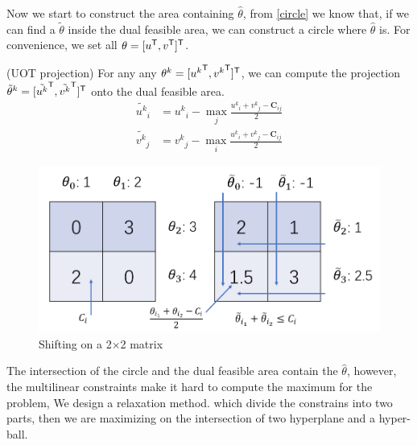 Now we start to construct the area containing $\hat{\theta}$, from \ref{circle} we know that, if we can find a $\tilde{\theta}$ inside the dual feasible area, we can construct a circle where $\hat{\theta}$ is.  For convenience, we set all $\theta = [u^{\mathsf T},v^{\mathsf T}]^{\mathsf T}$.
\begin{thm}
(UOT projection) For any any $\theta^k = [{u^k}^{\mathsf T},{v^k}^{\mathsf T}]^{\mathsf T}$, we can compute the projection $\tilde{\theta}^k = [\tilde{u^k}^{\mathsf T},\tilde{v^k}^{\mathsf T}]^{\mathsf T}$ onto the dual feasible area.
\begin{equation}
\begin{split}
\tilde{u^k}_i &= {u^k}_i - \max_j \frac{{u^k}_i +{v^k}_j - \mathbf{C}_{ij}}{2}\\
\tilde{v^k}_j &= {v^k}_j - \max_i \frac{{u^k}_i +{v^k}_j - \mathbf{C}_{ij}}{2}
 \end{split}
 \label{eq:uotdual}
\end{equation}
\end{thm}
	\begin{figure}[htbp]
	\begin{center}	
	\includegraphics[width=0.8\hsize]{pic/shifting}
	\caption{Shifting on a 2$\times$2 matrix}
	\end{center}	
	\end{figure}

The intersection of the circle and the dual feasible area contain the $\hat{\theta}$, however, the multilinear constraints make it hard to compute the maximum for the problem, We design a relaxation method. which divide the constrains into two parts, then we are maximizing on the intersection of two hyperplane and a hyper-ball. 

